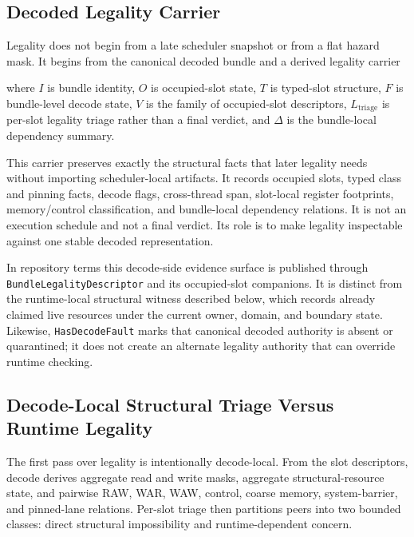 \documentclass[twocolumn]{article}
\begin{document}
\subsection{Decoded Legality Carrier}

Legality does not begin from a late scheduler snapshot or from a flat hazard mask. It begins from the canonical decoded bundle and a derived legality carrier



where \(I\) is bundle identity, \(O\) is occupied-slot state, \(T\) is typed-slot structure, \(F\) is bundle-level decode state, \(V\) is the family of occupied-slot descriptors, \(L_{\mathrm{triage}}\) is per-slot legality triage rather than a final verdict, and \(\Delta\) is the bundle-local dependency summary.

This carrier preserves exactly the structural facts that later legality needs without importing scheduler-local artifacts. It records occupied slots, typed class and pinning facts, decode flags, cross-thread span, slot-local register footprints, memory/control classification, and bundle-local dependency relations. It is not an execution schedule and not a final verdict. Its role is to make legality inspectable against one stable decoded representation.

In repository terms this decode-side evidence surface is published through \texttt{BundleLegalityDescriptor} and its occupied-slot companions. It is distinct from the runtime-local structural witness described below, which records already claimed live resources under the current owner, domain, and boundary state. Likewise, \texttt{HasDecodeFault} marks that canonical decoded authority is absent or quarantined; it does not create an alternate legality authority that can override runtime checking.


\subsection{Decode-Local Structural Triage Versus Runtime Legality}

The first pass over legality is intentionally decode-local. From the slot descriptors, decode derives aggregate read and write masks, aggregate structural-resource state, and pairwise RAW, WAR, WAW, control, coarse memory, system-barrier, and pinned-lane relations. Per-slot triage then partitions peers into two bounded classes: direct structural impossibility and runtime-dependent concern.
\end{document}
